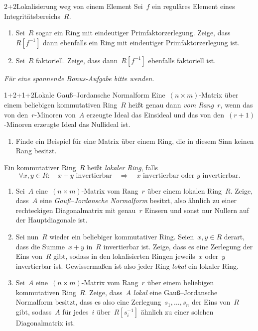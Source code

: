 \documentclass{algblatt}
\begin{document}
\begin{aufgabe}{2+2}{Lokalisierung weg von einem Element}
Sei~$f$ ein reguläres Element eines Integritätsbereichs~$R$.
\begin{enumerate}
\item Sei~$R$ sogar ein Ring mit eindeutiger Primfaktorzerlegung. Zeige,
dass~$R[f^{-1}]$ dann ebenfalls ein Ring mit eindeutiger Primfaktorzerlegung
ist.
\item Sei~$R$ faktoriell. Zeige, dass dann~$R[f^{-1}]$ ebenfalls faktoriell
ist.
\end{enumerate}
\end{aufgabe}

\begin{center}
\emph{Für eine spannende Bonus-Aufgabe bitte wenden.}
\end{center}
\newpage

\begin{aufgabe}{1+2+1+2}{Lokale Gauß--Jordansche Normalform}
Eine~$(n \times m)$-Matrix über einem beliebigen kommutativen Ring~$R$
heißt genau dann \emph{vom Rang~$r$}, wenn das von den~$r$-Minoren von~$A$
erzeugte Ideal das Einsideal und das von den~$(r+1)$-Minoren erzeugte Ideal das
Nullideal ist.
\begin{enumerate}
\item Finde ein Beispiel für eine Matrix über einem Ring, die in diesem Sinn
keinen Rang besitzt.
\end{enumerate}
Ein kommutativer Ring~$R$ heißt \emph{lokaler Ring}, falls
\[ \forall x,y \in R{:}\quad \text{$x + y$ invertierbar}
\quad\Longrightarrow\quad
\text{$x$ invertierbar oder $y$ invertierbar}. \]
\begin{enumerate}
\addtocounter{enumi}{1}
\item Sei~$A$ eine~$(n \times m)$-Matrix vom Rang~$r$ über einem lokalen Ring~$R$.
Zeige, dass~$A$ eine \emph{Gauß--Jordansche Normalform} besitzt,
also ähnlich zu einer rechteckigen Diagonalmatrix
mit genau~$r$ Einsern und sonst nur Nullern auf der Hauptdiagonale ist.
\item Sei nun~$R$ wieder ein beliebiger kommutativer Ring. Seien~$x,y \in R$ derart, dass die
Summe~$x+y$ in~$R$ invertierbar ist. Zeige, dass es eine Zerlegung der Eins
von~$R$ gibt, sodass in den lokalisierten Ringen jeweils~$x$ oder~$y$
invertierbar ist. Gewissermaßen ist also jeder Ring \emph{lokal} ein lokaler
Ring.
\item Sei~$A$ eine~$(n \times m)$-Matrix vom Rang~$r$ über einem beliebigen
kommutativen Ring~$R$. Zeige, dass~$A$ \emph{lokal} eine
Gauß--Jordansche Normalform besitzt, dass es also eine
Zerlegung~$s_1,\ldots,s_n$ der Eins von~$R$ gibt, sodass~$A$ für jedes~$i$
über~$R[s_i^{-1}]$ ähnlich zu einer solchen Diagonalmatrix ist.
\end{enumerate}
\end{aufgabe}
\end{document}
